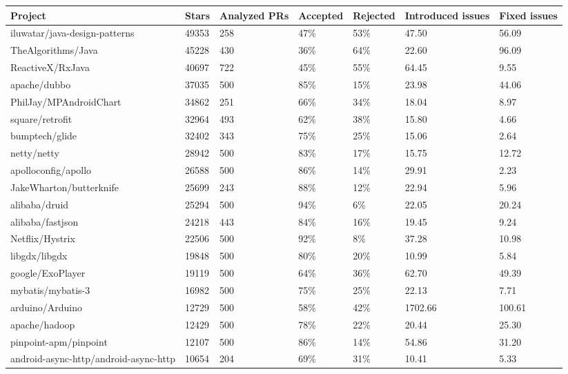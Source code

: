 \begin{tabular}{|p{4cm}p{0.8cm}p{1cm}p{1cm}p{1cm}p{1.2cm}p{0.8cm}|}
  \hline
Project & Stars & Analyzed PRs & Accepted & Rejected & Introduced issues & Fixed issues \\ 
  \hline \hline
iluwatar/java-design-patterns & 49353 & 258 & 47\% & 53\% & 47.50 & 56.09 \\ 
  TheAlgorithms/Java & 45228 & 430 & 36\% & 64\% & 22.60 & 96.09 \\ 
  ReactiveX/RxJava & 40697 & 722 & 45\% & 55\% & 64.45 & 9.55 \\ 
  apache/dubbo & 37035 & 500 & 85\% & 15\% & 23.98 & 44.06 \\ 
  PhilJay/MPAndroidChart & 34862 & 251 & 66\% & 34\% & 18.04 & 8.97 \\ 
  square/retrofit & 32964 & 493 & 62\% & 38\% & 15.80 & 4.66 \\ 
  bumptech/glide & 32402 & 343 & 75\% & 25\% & 15.06 & 2.64 \\ 
  netty/netty & 28942 & 500 & 83\% & 17\% & 15.75 & 12.72 \\ 
  apolloconfig/apollo & 26588 & 500 & 86\% & 14\% & 29.91 & 2.23 \\ 
  JakeWharton/butterknife & 25699 & 243 & 88\% & 12\% & 22.94 & 5.96 \\ 
  alibaba/druid & 25294 & 500 & 94\% & 6\% & 22.05 & 20.24 \\ 
  alibaba/fastjson & 24218 & 443 & 84\% & 16\% & 19.45 & 9.24 \\ 
  Netflix/Hystrix & 22506 & 500 & 92\% & 8\% & 37.28 & 10.98 \\ 
  libgdx/libgdx & 19848 & 500 & 80\% & 20\% & 10.99 & 5.84 \\ 
  google/ExoPlayer & 19119 & 500 & 64\% & 36\% & 62.70 & 49.39 \\ 
  mybatis/mybatis-3 & 16982 & 500 & 75\% & 25\% & 22.13 & 7.71 \\ 
  arduino/Arduino & 12729 & 500 & 58\% & 42\% & 1702.66 & 100.61 \\ 
  apache/hadoop & 12429 & 500 & 78\% & 22\% & 20.44 & 25.30 \\ 
  pinpoint-apm/pinpoint & 12107 & 500 & 86\% & 14\% & 54.86 & 31.20 \\ 
  android-async-http/android-async-http & 10654 & 204 & 69\% & 31\% & 10.41 & 5.33 \\ 
   \hline
\end{tabular}
